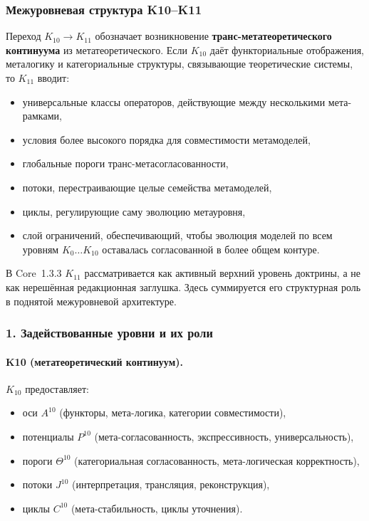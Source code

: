 
\subsubsection{Межуровневая структура K10–K11}
\label{sec:crossk-k10-k11}

Переход $K_{10} \rightarrow K_{11}$ обозначает возникновение
\textbf{транс-метатеоретического континуума} из метатеоретического.
Если $K_{10}$ даёт функториальные отображения, металогику и категориальные
структуры, связывающие теоретические системы, то $K_{11}$ вводит:
\begin{itemize}
  \item универсальные классы операторов, действующие между несколькими
        мета-рамками,
  \item условия более высокого порядка для совместимости метамоделей,
  \item глобальные пороги транс-метасогласованности,
  \item потоки, перестраивающие целые семейства метамоделей,
  \item циклы, регулирующие саму эволюцию метауровня,
  \item слой ограничений, обеспечивающий, чтобы эволюция моделей по всем уровням
        $K_0\dots K_{10}$ оставалась согласованной в более общем контуре.
\end{itemize}

В Core~1.3.3 $K_{11}$ рассматривается как активный верхний уровень доктрины, а не
как нерешённая редакционная заглушка. Здесь суммируется его структурная роль в
поднятой межуровневой архитектуре.

\subsubsection{1. Задействованные уровни и их роли}

\paragraph{K10 (метатеоретический континуум).}
$K_{10}$ предоставляет:
\begin{itemize}
  \item оси $A^{10}$ (функторы, мета-логика, категории совместимости),
  \item потенциалы $P^{10}$ (мета-согласованность, экспрессивность, универсальность),
  \item пороги $\Theta^{10}$ (категориальная согласованность,
        мета-логическая корректность),
  \item потоки $J^{10}$ (интерпретация, трансляция, реконструкция),
  \item циклы $C^{10}$ (мета-стабильность, циклы уточнения).
\end{itemize}

